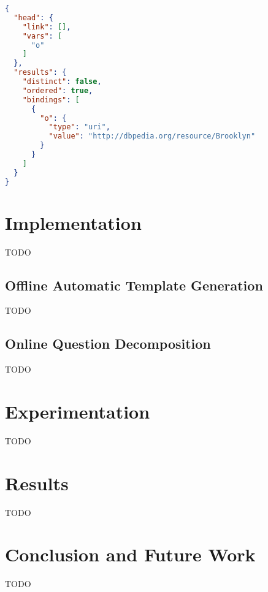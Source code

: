 \documentclass[sigplan,screen]{acmart}
\begin{document}
\begin{lstlisting}[language=json, frame=single,breaklines=true]
{
  "head": {
    "link": [],
    "vars": [
      "o"
    ]
  },
  "results": {
    "distinct": false,
    "ordered": true,
    "bindings": [
      {
        "o": {
          "type": "uri",
          "value": "http://dbpedia.org/resource/Brooklyn"
        }
      }
    ]
  }
}
\end{lstlisting}

\section*{Implementation}

TODO

\subsection*{Offline Automatic Template Generation}

TODO

\subsection*{Online Question Decomposition}

TODO

\section*{Experimentation}

TODO

\section*{Results}

TODO

\section*{Conclusion and Future Work}

TODO

\nocite{*}


\end{document}
